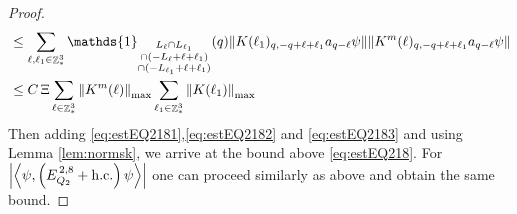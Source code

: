 \documentclass[sn-mathphys, Numbered ,a4paper]{sn-jnl}%
\DeclareMathOperator{\Z}{\mathbb{Z}}
\newcommand{\eva}[1]{\left\langle #1 \right\rangle}
\theoremstyle{plain}
\theoremstyle{definition}
\theoremstyle{remark}
\theoremstyle{plain}
\theoremstyle{definition}
\theoremstyle{remark}
\begin{document}
\begin{proof}
\begin{align}
	&\leq \sum\limits_{\ell, \ell_1\in \Z^3_*} \mathds{1}_{\substack{L_{\ell}\cap L_{\ell_1}\\\cap (-L_{\ell}+\ell+\ell_1) \\ \cap (-L_{\ell_1}+\ell+\ell_1)}} (q) \norm{K(\ell_1)_{q,-q+\ell+\ell_1} a_{q-\ell} \psi}\norm{ K^m(\ell)_{q,-q+\ell+\ell_1} a_{q-\ell}\psi }\nonumber\\
	&\leq C\,\Xi \sum\limits_{\ell \in \Z^3_*} \norm{K^m(\ell)}_{\mathrm{max}} \sum\limits_{\ell_1 \in \Z^3_*} \norm{K(\ell_1)}_{\mathrm{max}}  \label{eq:estEQ2183}
\end{align} 
Then adding \eqref{eq:estEQ2181},\eqref{eq:estEQ2182} and \eqref{eq:estEQ2183} and using Lemma \ref{lem:normsk}, we arrive at the bound above \eqref{eq:estEQ218}. For $\abs{\eva{\psi,\left(E^{\,2,8}_{Q_2}+\mathrm{h.c.}\right) \psi }}$ one can proceed similarly as above and obtain the same bound.
\end{proof}
\end{document}
